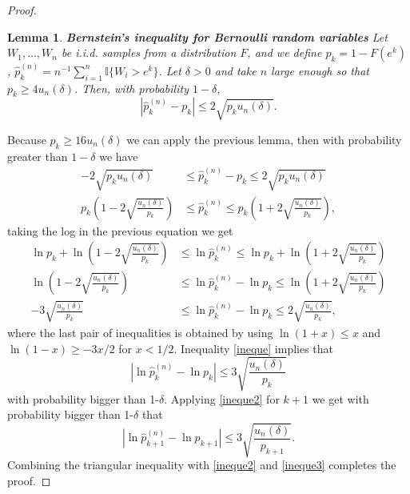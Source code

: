 \documentclass[sn-mathphys-ay]{sn-jnl}%
\newtheorem{lemma}{Lemma}[section]
\newcommand{\I}{\mathbb{I}}
\begin{document}
\begin{appendices}
\begin{proof}
    \begin{lemma}\label{bernstein}\textbf{Bernstein's inequality for Bernoulli random variables}
        Let \(W_1,\ldots,W_n\) be i.i.d. samples from a distribution \(F\), and we
        define \(p_k=1-F(e^k)\), \({\widehat p^{(n)}_k} =n^{-1}\sum_{i = 1}^n {\I\{ {{W_i} > {e^k}} \}}\).
        Let \(\delta>0\)
        and take \(n\) large enough so that \(p_k\geq 4u_n(\delta)\). Then, with
        probability \(1-\delta\),
        \begin{equation*}
            \left|\widehat{p}^{(n)}_k-p_k\right|\leq 2\sqrt{p_k u_n(\delta)}.
        \end{equation*}
    \end{lemma}
    Because \(p_k\geq 16 u_n(\delta)\) we can apply the previous lemma, then
    with probability greater than \(1-\delta\) we have
    \begin{align*}
        -2\sqrt{p_k u_n(\delta)}                          & \leq \widehat{p}^{(n)}_k-p_k\leq 2\sqrt{p_k u_n(\delta)}                         \\
        p_k\left(1-2\sqrt{\frac{u_n(\delta)}{p_k}}\right) & \leq \widehat{p}^{(n)}_k \leq p_k\left(1+2\sqrt{\frac{u_n(\delta)}{p_k}}\right),
    \end{align*}
    taking the log in the previous equation we get
    \begin{align}
        \ln{p_k}+\ln{\left(1-2\sqrt{\frac{u_n(\delta)}{p_k}}\right)} & \leq \ln{\widehat{p}^{(n)}_k} \leq \ln{p_k}+\ln{\left(1+2\sqrt{\frac{u_n(\delta)}{p_k}}\right)}\nonumber   \\
        \ln{\left(1-2\sqrt{\frac{u_n(\delta)}{p_k}}\right)}          & \leq \ln{\widehat{p}^{(n)}_k} - \ln{p_k} \leq \ln{\left(1+2\sqrt{\frac{u_n(\delta)}{p_k}}\right)}\nonumber \\
        -3\sqrt{\frac{u_n(\delta)}{p_k}}                             & \leq \ln{\widehat{p}^{(n)}_k} - \ln{p_k} \leq 2\sqrt{\frac{u_n(\delta)}{p_k}},\label{ineque}
    \end{align}
    where the last pair of inequalities is obtained by using \(\ln{(1+x)}\leq
    x\) and \(\ln{(1-x)}\geq-3x/2\) for \(x<1/2\). Inequality \eqref{ineque} implies that
    \begin{equation}
        \left|\ln{\widehat{p}^{(n)}_k} - \ln{p_k}\right| \leq 3\sqrt{\frac{u_n(\delta)}{p_k}}\label{ineque2}
    \end{equation}
    with probability bigger than 1-\(\delta\). Applying \eqref{ineque2} for \(k+1\) we get with probability bigger than
    1-\(\delta\) that
    \begin{equation}
        \left|\ln{\widehat{p}^{(n)}_{k+1}} - \ln{p_{k+1}}\right| \leq 3\sqrt{\frac{u_n(\delta)}{p_{k+1}}}.\label{ineque3}
    \end{equation}
    Combining the triangular inequality with \eqref{ineque2} and \eqref{ineque3}
    completes the proof.
\end{proof}


\end{appendices}
\end{document}
